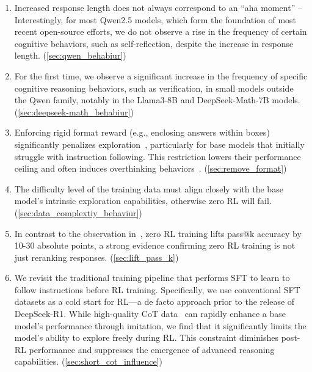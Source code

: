 \begin{tcolorbox}[colback=lightblue!80,breakable]
\begin{enumerate}[leftmargin=1em]
    \item Increased response length does not always correspond to an ``aha moment'' -- Interestingly, for most Qwen2.5 models, which form the foundation of most recent open-source efforts, we do not observe a rise in the frequency of certain cognitive behaviors, such as self-reflection, despite the increase in response length. (\textsection\ref{sec:qwen_behabiur})
    \item For the first time, we observe a significant increase in the frequency of specific cognitive reasoning behaviors, such as verification, in small models outside the Qwen family, notably in the Llama3-8B and DeepSeek-Math-7B models. (\textsection\ref{sec:deepseek-math_behabiur})
    \item Enforcing rigid format reward (e.g., enclosing answers within boxes)~\citep{guo2025deepseek} significantly penalizes exploration~\citep{singh2023beyond,wang2024planning}, particularly for base models that initially struggle with instruction following. This restriction lowers their  performance ceiling and often induces overthinking behaviors~\citep{chen2024not}. (\textsection\ref{sec:remove_format})
    \item The difficulty level of the training data must align closely with the base model's intrinsic exploration capabilities, otherwise zero RL will fail. (\textsection\ref{sec:data_complextiy_behaviur})
    \item In contrast to the observation in~\citet{shao2024deepseekmath}, zero RL training lifts pass@k accuracy by 10-30 absolute points, a strong evidence confirming zero RL training is not just reranking responses. (\textsection\ref{sec:lift_pass_k})
    \item We revisit the traditional training pipeline that performs SFT to learn to follow instructions before RL training. Specifically, we use conventional SFT datasets as a cold start for RL—a de facto approach prior to the release of DeepSeek-R1. While high-quality CoT data~\citep{li2024numinamath} can rapidly enhance a base model's performance through imitation, we find that it significantly limits the model's ability to explore freely during RL. This constraint diminishes post-RL performance and suppresses the emergence of advanced reasoning capabilities. (\textsection\ref{sec:short_cot_influence})
\end{enumerate}
\end{tcolorbox}

